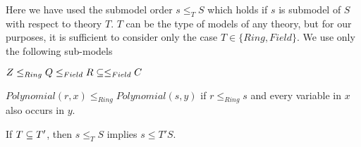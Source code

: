 Here we have used the submodel order $s\leq_T S$ which holds if $s$ is submodel of $S$ with respect to theory $T$.
$T$ can be the type of models of any theory, but for our purposes, it is sufficient to consider only the case $T\in\{Ring,Field\}$.
We use only the following sub-models
\begin{compactitem}
 \item $Z\leq_{Ring} Q\leq_{Field} R\sq\leq_{Field} C$
 \item $Polynomial(r,x)\leq_{Ring} Polynomial(s,y)$ if $r\leq_{Ring} s$ and every variable in $x$ also occurs in $y$.
 \item If $T\sq T'$, then $s\leq_T S$ implies $s\leq{T'}S$.
\end{compactitem}



